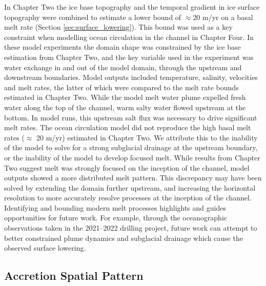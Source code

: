 In Chapter Two the ice base topography and the temporal gradient in ice surface topography were combined to estimate a lower bound of $\approx$20 m/yr on a basal melt rate (Section \ref{sec:surface_lowering}). This bound was used as a key constraint when modelling ocean circulation in the channel in Chapter Four. 
In these model experiments the domain shape was constrained by the ice base estimation from Chapter Two, and the key variable used in the experiment was water exchange in and out of the model domain, through the upstream and downstream boundaries. Model outputs included temperature, salinity, velocities and melt rates, the latter of which  were compared to the melt rate bounds estimated in Chapter Two. 
While the model melt water plume expelled fresh water along the top of the channel, warm salty water flowed upstream at the bottom. In model runs, this upstream salt flux was necessary to drive significant melt rates.
The ocean circulation model did not reproduce the high basal melt rates ($\approx$ 20 m/yr) estimated in Chapter Two. We attribute this to the inability of the model to solve for a strong subglacial drainage at the upstream boundary, or the inability of the model to develop focused melt. While results from Chapter Two suggest melt was strongly focused on the inception of the channel, model outputs showed a more distributed melt pattern. This discrepancy may have been solved by extending the domain further upstream, and increasing the horizontal resolution to more accurately resolve processes at the inception of the channel. 
Identifying and bounding modern melt processes highlights and guides opportunities for future work. For example, through the oceanographic observations taken in the 2021--2022 drilling project, future work can attempt to better constrained plume dynamics and subglacial drainage which cause the observed surface lowering.  

\subsection{Accretion Spatial Pattern}

